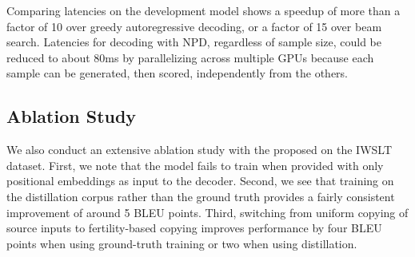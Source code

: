 \documentclass{article} %
\begin{document}
Comparing latencies on the development model shows a speedup of more than a factor of 10 over greedy autoregressive decoding, or a factor of 15 over beam search.  Latencies for decoding with NPD, regardless of sample size, could be reduced to about 80ms by parallelizing across multiple GPUs because each sample can be generated, then scored, independently from the others.

\subsection{Ablation Study}
We also conduct an extensive ablation study with the proposed \model{} on the IWSLT dataset. First, we note that the model fails to train when provided with only positional embeddings as input to the decoder. Second, we see that training on the distillation corpus rather than the ground truth provides a fairly consistent improvement of around 5 BLEU points. Third, switching from uniform copying of source inputs to fertility-based copying improves performance by four BLEU points when using ground-truth training or two when using distillation.
\end{document}
